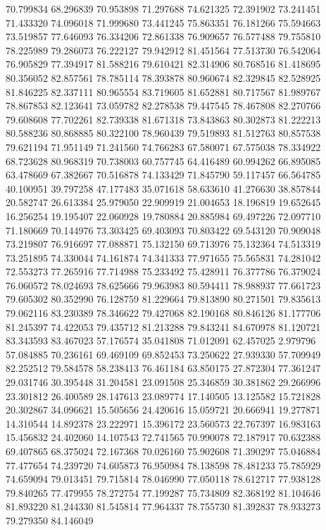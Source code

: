 70.799834
68.296839
70.953898
71.297688
74.621325
72.391902
73.241451
71.433320
74.096018
71.999680
73.441245
75.863351
76.181266
75.594663
73.519857
77.646093
76.334206
72.861338
76.909657
76.577488
79.755810
78.225989
79.286073
76.222127
79.942912
81.451564
77.513730
76.542064
76.905829
77.394917
81.588216
79.610421
82.314906
80.768516
81.418695
80.356052
82.857561
78.785114
78.393878
80.960674
82.329845
82.528925
81.846225
82.337111
80.965554
83.719605
81.652881
80.717567
81.989767
78.867853
82.123641
73.059782
82.278538
79.447545
78.467808
82.270766
79.608608
77.702261
82.739338
81.671318
73.843863
80.302873
81.222213
80.588236
80.868885
80.322100
78.960439
79.519893
81.512763
80.857538
79.621194
71.951149
71.241560
74.766283
67.580071
67.575038
78.334922
68.723628
80.968319
70.738003
60.757745
64.416489
60.994262
66.895085
63.478669
67.382667
70.516878
74.133429
71.845790
59.117457
66.564785
40.100951
39.797258
47.177483
35.071618
58.633610
41.276630
38.857844
20.582747
26.613384
25.979050
22.909919
21.004653
18.196819
19.652645
16.256254
19.195407
22.060928
19.780884
20.885984
69.497226
72.097710
71.180669
70.144976
73.303425
69.403093
70.803422
69.543120
70.909048
73.219807
76.916697
77.088871
75.132150
69.713976
75.132364
74.513319
73.251895
74.330044
74.161874
74.341333
77.971655
75.565831
74.281042
72.553273
77.265916
77.714988
75.233492
75.428911
76.377786
76.379024
76.060572
78.024693
78.625666
79.963983
80.594411
78.988937
77.661723
79.605302
80.352990
76.128759
81.229664
79.813890
80.271501
79.835613
79.062116
83.230389
78.346622
79.427068
82.190168
80.846126
81.177706
81.245397
74.422053
79.435712
81.213288
79.843241
84.670978
81.120721
83.343593
83.467023
57.176574
35.041808
71.012091
62.457025
2.979796
57.084885
70.236161
69.469109
69.852453
73.250622
27.939330
57.709949
82.252512
79.584578
58.238413
76.461184
63.850175
27.872304
77.361247
29.031746
30.395448
31.204581
23.091508
25.346859
30.381862
29.266996
23.301812
26.400589
28.147613
23.089774
17.140505
13.125582
15.721828
20.302867
34.096621
15.505656
24.420616
15.059721
20.666941
19.277871
14.310544
14.892378
23.222971
15.396172
23.560573
22.767397
16.983163
15.456832
24.402060
14.107543
72.741565
70.990078
72.187917
70.632388
69.407865
68.375024
72.167368
70.026160
75.902608
71.390297
75.046884
77.477654
74.239720
74.605873
76.950984
78.138598
78.481233
75.785929
74.659094
79.013451
79.715814
78.046990
77.050118
78.612717
77.938128
79.840265
77.479955
78.272754
77.199287
75.734809
82.368192
81.104646
81.893220
81.244330
81.545814
77.964337
78.755730
81.392837
78.933273
79.279350
84.146049
